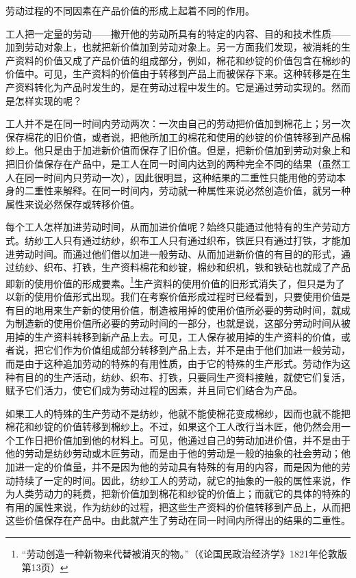 \documentclass{ctexbook}
\begin{document}
劳动过程的不同因素在产品价值的形成上起着不同的作用。

工人把一定量的劳动——撇开他的劳动所具有的特定的内容、目的和技术性质——加到劳动对象上，也就把新价值加到劳动对象上。另一方面我们发现，被消耗的生产资料的价值又成了产品价值的组成部分，例如，棉花和纱锭的价值包含在棉纱的价值中。可见，生产资料的价值由于转移到产品上而被保存下来。这种转移是在生产资料转化为产品时发生的，是在劳动过程中发生的。它是通过劳动实现的。然而是怎样实现的呢？

工人并不是在同一时间内劳动两次：一次由自己的劳动把价值加到棉花上；另一次保存棉花的旧价值，或者说，把他所加工的棉花和使用的纱锭的价值转移到产品棉纱上。他只是由于加进新价值而保存了旧价值。但是，把新价值加到劳动对象上和把旧价值保存在产品中，是工人在同一时间内达到的两种完全不同的结果（虽然工人在同一时间内只劳动一次），因此很明显，这种结果的二重性只能用他的劳动本身的二重性来解释。在同一时间内，劳动就一种属性来说必然创造价值，就另一种属性来说必然保存或转移价值。

每个工人怎样加进劳动时间，从而加进价值呢？始终只能通过他特有的生产劳动方式。纺纱工人只有通过纺纱，织布工人只有通过织布，铁匠只有通过打铁，才能加进劳动时间。而通过他们借以加进一般劳动、从而加进新价值的有目的的形式，通过纺纱、织布、打铁，生产资料棉花和纱锭，棉纱和织机，铁和铁砧也就成了产品即新的使用价值的形成要素。\footnote{“劳动创造一种新物来代替被消灭的物。”（《论国民政治经济学》1821年伦敦版第13页）}生产资料的使用价值的旧形式消失了，但只是为了以新的使用价值形式出现。我们在考察价值形成过程时已经看到，只要使用价值是有目的地用来生产新的使用价值，制造被用掉的使用价值所必要的劳动时间，就成为制造新的使用价值所必要的劳动时间的一部分，也就是说，这部分劳动时间从被用掉的生产资料转移到新产品上去。可见，工人保存被用掉的生产资料的价值，或者说，把它们作为价值组成部分转移到产品上去，并不是由于他们加进一般劳动，而是由于这种追加劳动的特殊的有用性质，由于它的特殊的生产形式。劳动作为这种有目的的生产活动，纺纱、织布、打铁，只要同生产资料接触，就使它们复活，赋予它们活力，使它们成为劳动过程的因素，并且同它们结合为产品。

如果工人的特殊的生产劳动不是纺纱，他就不能使棉花变成棉纱，因而也就不能把棉花和纱锭的价值转移到棉纱上。不过，如果这个工人改行当木匠，他仍然会用一个工作日把价值加到他的材料上。可见，他通过自己的劳动加进价值，并不是由于他的劳动是纺纱劳动或木匠劳动，而是由于他的劳动是一般的抽象的社会劳动；他加进一定的价值量，并不是因为他的劳动具有特殊的有用的内容，而是因为他的劳动持续了一定的时间。因此，纺纱工人的劳动，就它的抽象的一般的属性来说，作为人类劳动力的耗费，把新价值加到棉花和纱锭的价值上；而就它的具体的特殊的有用的属性来说，作为纺纱的过程，把这些生产资料的价值转移到产品上，从而把这些价值保存在产品中。由此就产生了劳动在同一时间内所得出的结果的二重性。
\end{document}
